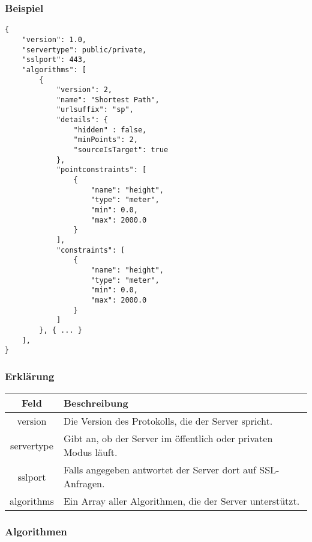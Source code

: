 \documentclass[ngerman,titlepage,parskip=true]{scrartcl}
\begin{document}
\subsubsection{Beispiel}
	
	\begin{lstlisting}
{
    "version": 1.0,
    "servertype": public/private,
    "sslport": 443,
    "algorithms": [
        {
            "version": 2,
            "name": "Shortest Path",
            "urlsuffix": "sp",
            "details": {
                "hidden" : false,
                "minPoints": 2,
                "sourceIsTarget": true 
            },
            "pointconstraints": [                    
                {
                    "name": "height",
                    "type": "meter",
                    "min": 0.0,
                    "max": 2000.0
                }
            ],
            "constraints": [
                {
                    "name": "height",
                    "type": "meter",
                    "min": 0.0,
                    "max": 2000.0
                }
            ]
        }, { ... }
    ],
}
    \end{lstlisting}
    \subsubsection*{Erklärung}
    
    \begin{tabular}{|c|p{14cm}|}
    	\hline
    	\textbf{Feld} & \textbf{Beschreibung} \\ 
    	\hline \hline
    	
    	version & Die Version des Protokolls, die der Server spricht. \\ 
    	\hline
    	
    	servertype & Gibt an, ob der Server im öffentlich oder privaten Modus läuft. \\
    	\hline
    	sslport & Falls angegeben antwortet der Server dort auf SSL-Anfragen.\\
    	\hline
    	
    	algorithms & Ein Array aller Algorithmen, die der Server unterstützt. \\
    	\hline
    \end{tabular}
    
    \subsubsection*{Algorithmen}
    
\end{document}

